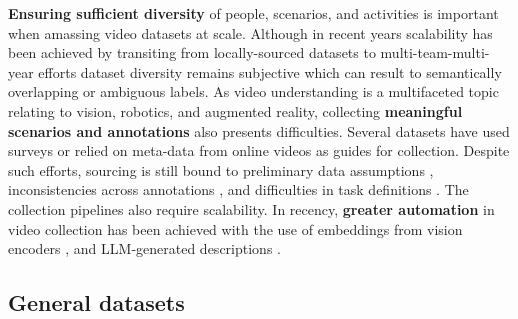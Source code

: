 \noindent
\textbf{Ensuring sufficient diversity} of people, scenarios, and activities is important when amassing video datasets at scale. Although in recent years scalability has been achieved by transiting from locally-sourced datasets  to multi-team-multi-year efforts  dataset diversity remains subjective which can result to semantically overlapping  or ambiguous  labels. As video understanding is a multifaceted topic relating to vision, robotics, and augmented reality, collecting \textbf{meaningful scenarios and annotations} also presents difficulties. Several datasets have used surveys  or relied on meta-data from online videos  as guides for collection. Despite such efforts, sourcing is still bound to preliminary data assumptions , inconsistencies across annotations , and difficulties in task definitions . The collection pipelines also require scalability. In recency, \textbf{greater automation} in video collection has been achieved with the use of embeddings from vision encoders , and LLM-generated descriptions .



\subsection{General datasets}
\label{sec:datasets::general}

